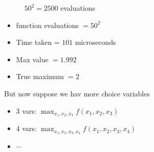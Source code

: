 \documentclass[
    xcolor={svgnames,dvipsnames},
    hyperref={colorlinks, citecolor=DeepPink4, linkcolor=DarkRed, urlcolor=DarkBlue}
    ]{beamer}  %
\newcommand{\1}{\mathbbm 1}
\begin{document}
\begin{frame}
    
    \begin{figure}
       \begin{center}
           \caption{$50^2 = 2500$ evaluations}
       \end{center}
    \end{figure}

\end{frame}


\begin{frame}
    
    \begin{itemize}
        \item function evaluations $= 50^2$
    \vspace{0.5em}
        \item Time taken = $101$ microseconds
    \vspace{0.5em}
        \item Max value $= 1.992$
    \vspace{0.5em}
        \item True maximum $= 2$
    \end{itemize}

    \vspace{1em}


\end{frame}


\begin{frame}
    
    But now suppose we hav more choice variables

    \begin{itemize}
        \item 3 vars: $\max_{x_1, x_2, x_3} f(x_1, x_2, x_3)$
        \vspace{0.5em}
        \item 4 vars: $\max_{x_1, x_2, x_3, x_4} f(x_1, x_2, x_3, x_4)$
        \vspace{0.5em}
        \item $\cdots$
    \end{itemize}


\end{frame}
\end{document}
